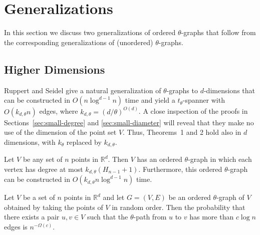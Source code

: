\documentclass{elsart}
\begin{document}
\section{Generalizations}

In this section we discuss two generalizations of ordered
$\theta$-graphs that follow from the corresponding generalizations of
(unordered) $\theta$-graphs.

\subsection{Higher Dimensions}

Ruppert and Seidel \cite{rs91} give a natural generalization of
$\theta$-graphs to $d$-dimensions that can be constructed in
$O(n\log^{d-1} n)$ time and yield a $t_\theta$-spanner with
$O(k_{d,\theta}n)$ edges, where $k_{d,\theta}=(d/\theta)^{O(d)}$.  A
close inspection of the proofs in Sections~\ref{sec:small-degree} and
\ref{sec:small-diameter} will reveal that they make no use of the
dimension of the point set $V$.  Thus, Theorems~{1} and {2} hold also
in $d$ dimensions, with $k_\theta$ replaced by $k_{d,\theta}$.

\begin{thm}
Let $V$ be any set of $n$ points in $\mathbb{R}^d$.  Then $V$ has an
ordered $\theta$-graph in which each vertex has degree at most
$k_{d,\theta}(H_{n-1}+1)$.  Furthermore, this ordered $\theta$-graph
can be constructed in $O(k_{d,\theta} n\log^{d-1} n)$ time.
\end{thm}

\begin{thm}
Let $V$ be a set of $n$ points in $\mathbb{R}^d$ and let $G=(V,E)$ be
an ordered $\theta$-graph of $V$ obtained by taking the points of $V$
in random order.  Then the probability that there exists a pair
$u,v\in V$ such that the $\theta$-path from $u$ to $v$ has more than
$c\log n$ edges is $n^{-\Omega(c)}$.
\end{thm}
\end{document}
